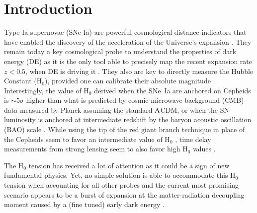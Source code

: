 \documentclass[]{aa} %
\newcommand{\mr}[1]{{\textcolor[rgb]{0.60,0.10,0.6}{#1}}}
\newcommand{\nn}[1]{{\textcolor[rgb]{1, 0.27, 0}{#1}}}
\begin{document}
\section{Introduction}






Type Ia supernovae (SNe Ia) are powerful cosmological distance indicators that
have enabled the discovery of the acceleration of the Universe's expansion
\citep{riess1998, perlmutter1999}. They remain today a key cosmological probe to
understand the properties of dark energy (DE) as it is the only tool able to
precisely map the recent expansion rate $z<0.5$, when DE is driving it
\citep[e.g.][]{scolnicastro2020}. They also are key to directly measure the
Hubble Constant (H$_0$), provided one can calibrate their absolute magnitude
\citep{riess2016, freedman2019}. Interestingly, the value of H$_0$ derived when
the SNe~Ia are anchored on Cepheids \citep[the SH0ES
project][]{riess2009,riess2016} is $\sim5\sigma$ higher than what is predicted
by cosmic microwave background (CMB) data measured by Planck assuming the
standard $\Lambda$CDM\nn{,} or when the SN luminosity is anchored at intermediate
redshift by the baryon acoustic oscillation (BAO) scale
\citep{riess2019,reid2019,planck2016, feeney2019}.  While using the tip of the
red giant branch technique in place of the Cepheids seem to favor an
\mr{intermediate} value of H$_0$ \citep{freedman2019}, time delay measurements
from strong lensing seem to also favor high H$_0$ values \citep{wong2019}.

The H$_0$ tension has received a lot of attention as it could be a sign of new
fundamental physics. Yet, no simple solution is able to accommodate this H$_0$
tension when accounting for all other probes \citep{knox2019} and the current
most promising scenario appears to be a burst of expansion at the
matter-radiation decoupling moment caused by a (fine tuned) early dark energy
\citep{poulin2019}.
\end{document}
